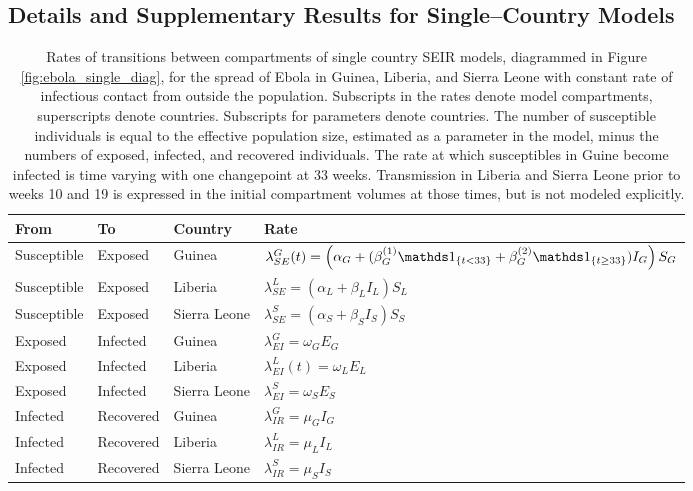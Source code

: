 \subsection{Details and Supplementary Results for Single--Country Models}
\label{subsec:ebola_single_country_supplement}

\begin{table}[htbp]
	\caption[Transmission rates for single country SEIR models for Ebola in West Africa.]{Rates of transitions between compartments of single country SEIR models, diagrammed in Figure \ref{fig:ebola_single_diag}, for the spread of Ebola in Guinea, Liberia, and Sierra Leone with constant rate of infectious contact from outside the population. Subscripts in the rates denote model compartments, superscripts denote countries. Subscripts for parameters denote countries. The number of susceptible individuals is equal to the effective population size, estimated as a parameter in the model, minus the numbers of exposed, infected, and recovered individuals. The rate at which susceptibles in Guine become infected is time varying with one changepoint at 33 weeks. Transmission in Liberia and Sierra Leone prior to weeks 10 and 19 is expressed in the initial compartment volumes at those times, but is not modeled explicitly.}
	\label{tab:ebola_rates_single}
	\centering\footnotesize
	\begin{tabular}{llll}
		\hline
		\textbf{From} & \textbf{To} & \textbf{Country} & \textbf{Rate} \\
		\hline
		Susceptible & Exposed & Guinea & $ \lambda_{SE}^G(t) = \left (\alpha_G + (\beta_G^{(1)} \ind{t<33} + \beta_G^{(2)}\ind{t\geq33})I_G\right )S_G $ \\
		Susceptible & Exposed & Liberia & $ \lambda_{SE}^L = \left (\alpha_L + \beta_LI_L\right )S_L $\\
		Susceptible & Exposed & Sierra Leone & $ \lambda_{SE}^S = \left (\alpha_S + \beta_SI_S\right )S_S $ \\
		Exposed & Infected & Guinea & $ \lambda_{EI}^G = \omega_GE_G $\\
		Exposed & Infected & Liberia & $ \lambda_{EI}^L(t) = \omega_LE_L $ \\
		Exposed & Infected & Sierra Leone & $\lambda_{EI}^S = \omega_SE_S$ \\
		Infected & Recovered & Guinea & $ \lambda_{IR}^G = \mu_GI_G $ \\
		Infected & Recovered & Liberia & $ \lambda_{IR}^L = \mu_LI_L $ \\	
		Infected & Recovered & Sierra Leone & $ \lambda_{IR}^S = \mu_SI_S$ \\
		\hline
	\end{tabular}
\end{table}

